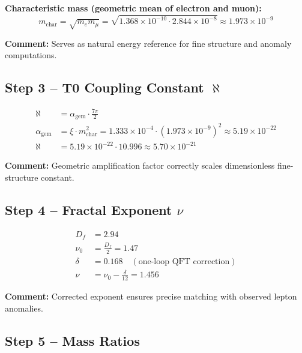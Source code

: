\documentclass[12pt,a4paper]{article}
\begin{document}
\textbf{Characteristic mass (geometric mean of electron and muon):}
\begin{equation}
	m_\text{char} = \sqrt{m_e m_\mu} = \sqrt{1.368 \times 10^{-10} \cdot 2.844 \times 10^{-8}} \approx 1.973 \times 10^{-9}
\end{equation}

\textbf{Comment:} Serves as natural energy reference for fine structure and anomaly computations.

\subsection{Step 3 – T0 Coupling Constant $\aleph$}

\begin{align}
	\aleph &= \alpha_\text{gem} \cdot \frac{7\pi}{2} \\
	\alpha_\text{gem} &= \xi \cdot m_\text{char}^2 = 1.333 \times 10^{-4} \cdot (1.973 \times 10^{-9})^2 \approx 5.19 \times 10^{-22} \\
	\aleph &= 5.19 \times 10^{-22} \cdot 10.996 \approx 5.70 \times 10^{-21}
\end{align}

\textbf{Comment:} Geometric amplification factor correctly scales dimensionless fine-structure constant.

\subsection{Step 4 – Fractal Exponent \(\nu\)}

\begin{align}
	D_f &= 2.94 \\
	\nu_0 &= \frac{D_f}{2} = 1.47 \\
	\delta &= 0.168 \quad (\text{one-loop QFT correction}) \\
	\nu &= \nu_0 - \frac{\delta}{12} = 1.456
\end{align}

\textbf{Comment:} Corrected exponent ensures precise matching with observed lepton anomalies.

\subsection{Step 5 – Mass Ratios}
\end{document}
